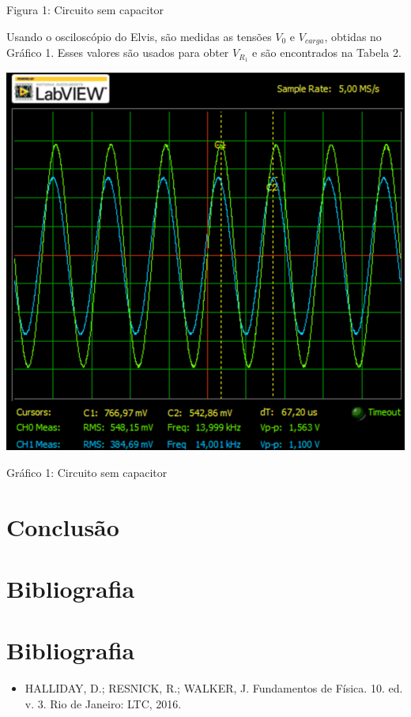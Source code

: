 \documentclass[a4 paper]{article}
\begin{document}
\begin{center}
Figura 1: Circuito sem capacitor
\end{center}

Usando o osciloscópio do Elvis, são medidas as tensões $V_0$ e $V_{carga}$, obtidas no Gráfico 1. Esses valores são usados para obter $V_{R_1}$ e são encontrados na Tabela 2. 

\begin{table}[h]
\centering
\includegraphics[scale=0.38]{rgadicoas/rgadicoa1}
\end{table}

\begin{center}
Gráfico 1: Circuito sem capacitor
\end{center}




\section{Conclusão}

\section{Bibliografia}

\section{Bibliografia}

\begin{itemize}
\item HALLIDAY, D.; RESNICK, R.; WALKER, J. Fundamentos de Física. 10. ed. v. 3. Rio de Janeiro: LTC, 2016.
\end{itemize}
\end{document}
